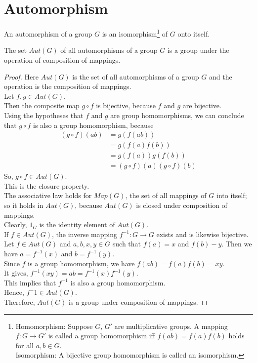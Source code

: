 \documentclass[../main-sheet.tex]{subfiles}
\begin{document}
\chapter{Automorphism}
\begin{defn}[Automorphism]
    An automorphism of a group \(G\) is an isomorphism\footnote{
        Homomorphism: Suppose \(G,\,G'\) are multiplicative groups. A mapping \(f:G\to G'\) is called a group homomorphism iff \(f(ab)=f(a)f(b)\) holds for all \(a,b\in G\).\\
        Isomorphism: A bijective group homomorphism is called an isomorphism. 
    } of \(G\) onto itself.
\end{defn}
\begin{thm}
    The set \(Aut(G)\) of all automorphisms of a group \(G\) is a group under the operation of composition of mappings.
\end{thm}
\begin{proof}
    Here \(Aut(G)\) is the set of all automorphisms of a group \(G\) and the operation is the composition of mappings.\\
    Let \(f,g\in Aut(G)\).\\
    Then the composite map \(g \circ f\) is bijective, because \(f\) and \(g\) are bijective.\\
    Using the hypotheses that \(f\) and \(g\) are group homomorphisms, we can conclude that \(g\circ f\) is also a group homomorphism, because
    \begin{align*}
        (g\circ f)(ab)&=g(f(ab))\\
        &=g(f(a)f(b))\\
        &=g(f(a))g(f(b))\\
        &=(g\circ f)(a)(g\circ f)(b)
    \end{align*} 
    So, \(g\circ f \in Aut(G)\).\\
    This is the closure property.\\

    The associative law holds for \(Map(G)\), the set of all mappings of \(G\) into itself; so it holds in \(Aut(G)\), because \(Aut(G)\) is closed under composition of mappings.\\

    Clearly, \(1_G\) is the identity element of \(Aut(G)\).\\

    If \(f\in Aut(G)\), the inverse mapping \(f^{-1}:G\to G\) exists and is likewise bijective.\\
    Let \(f\in Aut(G)\) and \(a,b,x,y\in G\) such that \(f(a)=x\) and \(f(b)-y\).
    Then we have \(a=f^{-1}(x)\) and \(b=f^{-1}(y)\).\\
    Since \(f\) is a group homomorphism, we have \(f(ab)=f(a)f(b)=xy\).\\
    It gives, \(f^{-1}(xy)=ab=f^{-1}(x)f^{-1}(y)\).\\
    This implies that \(f^{-1}\) is also a group homomorphism.\\
    Hence, \(f^-1\in Aut(G)\).\\
    Therefore, \(Aut(G)\) is a group under composition of mappings.
\end{proof}
\end{document}
